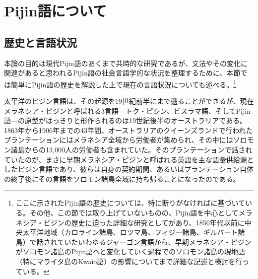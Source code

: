\section{Pijin語について}
\subsection{歴史と言語状況}
本論の目的は現代Pijin語のあくまで共時的な研究であるが、文法やその変化に関連があると思われるPijin語の社会言語学的な状況を整理するために、本節では簡単にPijin語の歴史を解説した上で現在の言語状況についても述べる。\footnote{
ここに示されたPijin語の歴史については、特に断りがなければ\cite{phonology}に基づいている。その他、この節では取り上げていないものの、Pijin語を中心としてメラネシア・ピジンの歴史に迫った詳細な研究として\cite{keesing}があり、1850年代以前に中央太平洋地域（カロライン諸島、ロツマ島、フィジー諸島、ギルバート諸島）で話されていたいわゆるジャーゴン言語から、早期メラネシア・ピジンがソロモン諸島のPijin語へと変化していく過程でのソロモン諸島の現地語（特にマライタ島のKwaio語）の影響についてまで詳細な記述と検討を行っている。}

太平洋のピジン言語は、その起源を19世紀前半にまで遡ることができる\cite{keesing}が、現在メラネシア・ピジンと呼ばれる3言語---トク・ピシン、ビスラマ語、そしてPijin語---の原型がはっきりと形作られるのは19世紀後半のオーストラリアである。1863年から1906年までの43年間、オーストラリアのクイーンズランドで行われたプランテーションにはメラネシア全域から労働者が集められ、その中にはソロモン諸島からの13,000人の労働者も含まれていた。そのプランテーションで話されていたのが、まさに早期メラネシア・ピジンと呼ばれる英語を主な語彙供給源としたピジン言語であり、彼らは自身の契約期間、あるいはプランテーション自体の終了後にその言語をソロモン諸島全域に持ち帰ることになったのである。

